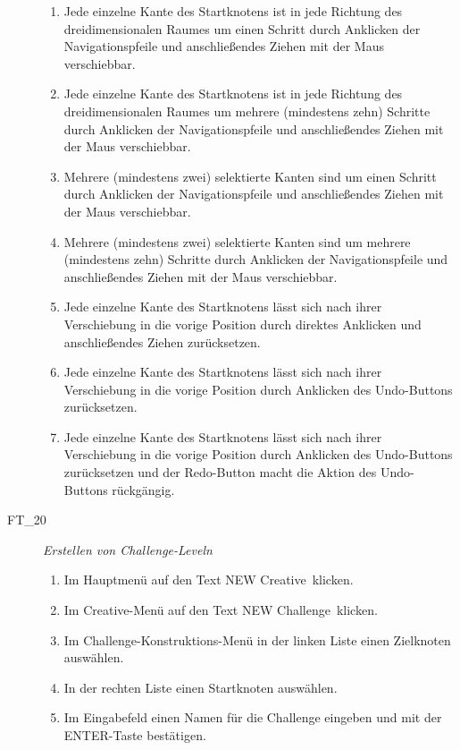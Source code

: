 \begin{description}
\begin{enumerate}
		\item Jede einzelne Kante des Startknotens ist in jede Richtung des dreidimensionalen Raumes um einen Schritt durch Anklicken der Navigationspfeile und anschließendes Ziehen mit der Maus verschiebbar.
		\item Jede einzelne Kante des Startknotens ist in jede Richtung des dreidimensionalen Raumes um mehrere (mindestens zehn) Schritte durch Anklicken der Navigationspfeile und anschließendes Ziehen mit der Maus verschiebbar.
		\item Mehrere (mindestens zwei) selektierte Kanten sind um einen Schritt durch Anklicken der Navigationspfeile und anschließendes Ziehen mit der Maus verschiebbar.
		\item Mehrere (mindestens zwei) selektierte Kanten sind um mehrere (mindestens zehn) Schritte durch Anklicken der Navigationspfeile und anschließendes Ziehen mit der Maus verschiebbar.
		
		\item Jede einzelne Kante des Startknotens lässt sich nach ihrer Verschiebung in die vorige Position durch direktes Anklicken und anschließendes Ziehen zurücksetzen.
		\item Jede einzelne Kante des Startknotens lässt sich nach ihrer Verschiebung in die vorige Position durch Anklicken des \glqq Undo\grqq-Buttons zurücksetzen.
		\item Jede einzelne Kante des Startknotens lässt sich nach ihrer Verschiebung in die vorige Position durch Anklicken des \glqq Undo\grqq-Buttons zurücksetzen und der \glqq Redo\grqq-Button macht die Aktion des \glqq Undo\grqq-Buttons rückgängig.
		~\\
	
	\end{enumerate}
	
	
	\item[FT\_20] \textit{Erstellen von Challenge-Leveln} \hfill\\
	
	\label{FT:20}
	
	\begin{enumerate} %
	
		\item Im Hauptmenü auf den Text \glqq NEW Creative\grqq~klicken.
		\item Im Creative-Menü auf den Text \glqq NEW Challenge\grqq~klicken.
		\item Im Challenge-Konstruktions-Menü in der linken Liste einen Zielknoten auswählen.
		\item In der rechten Liste einen Startknoten auswählen.
		\item Im Eingabefeld einen Namen für die Challenge eingeben und mit der \glqq ENTER\grqq-Taste bestätigen.
		~\\
		

\end{enumerate}
\end{description}
